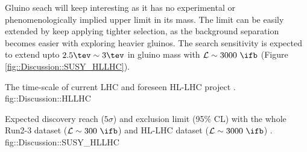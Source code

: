 Gluino seach will keep interesting as it has no experimental or phenomenologically implied upper limit in its mass. 
The limit can be easily extended by keep applying tighter selection, as the background separation becomes easier with exploring heavier gluinos. 
The search sensitivity is expected to extend upto $2.5\tev\sim3\tev$ in gluino mass with $\mathcal{L}\sim 3000\,\,\ifb$ (Figure \ref{fig::Discussion::SUSY_HLLHC}).


{The time-scale of current LHC and foreseen HL-LHC project \cite{HLLHC}.}
{fig::Discussion::HLLHC}

{Expected discovery reach ($5\sigma$) and exclusion limit (95$\%$ CL) with the whole Run2-3 dataset ($\mathcal{L}\sim 300\,\,\ifb$) and HL-LHC dataset ($\mathcal{L}\sim 3000\,\,\ifb$) \cite{SUSY_HLLHC}.}
{fig::Discussion::SUSY_HLLHC}








%
%
%
%
%
%
%
%

